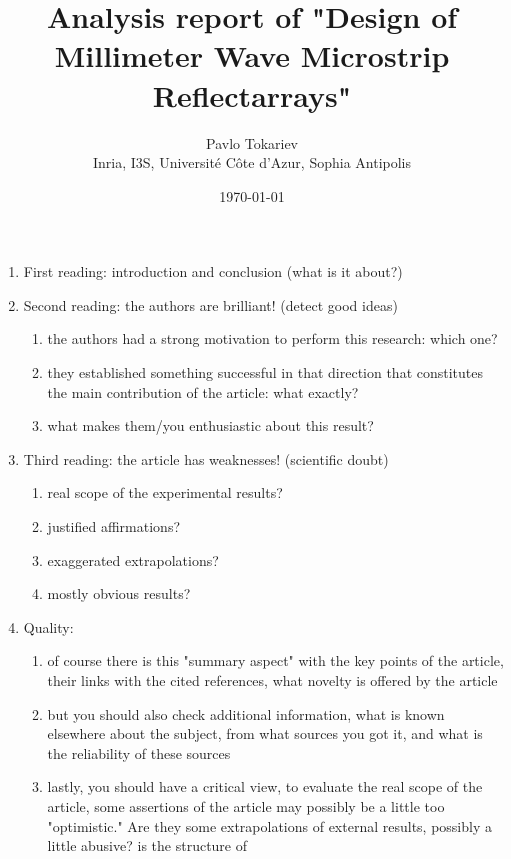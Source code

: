 \documentclass{article}
\title{Analysis report of "Design of Millimeter Wave Microstrip Reflectarrays"}
\author{Pavlo Tokariev\\Inria, I3S, Université Côte d'Azur, Sophia Antipolis}
\date{\today}
\begin{document}
    \maketitle

    \begin{enumerate}
        \item First reading: introduction and conclusion (what is it about?)
        \item Second reading: the authors are brilliant! (detect good ideas)
        \begin{enumerate}
            \item the authors had a strong motivation to perform this research: which one?
            \item they established something successful in that direction that constitutes the main contribution of the article: what exactly?
            \item what makes them/you enthusiastic about this result?
        \end{enumerate}
        \item Third reading: the article has weaknesses! (scientific doubt)
        \begin{enumerate}
            \item real scope of the experimental results?
            \item justified affirmations?
            \item exaggerated extrapolations?
            \item mostly obvious results?
        \end{enumerate}
        \item Quality:
        \begin{enumerate}
            \item of course there is this "summary aspect" with the key points of
            the article, their links with the cited references, what novelty is
            offered by the article
            \item but you should also check additional information, what is
            known elsewhere about the subject, from what sources you got
            it, and what is the reliability of these sources
            \item lastly, you should have a critical view, to evaluate the real
            scope of the article, some assertions of the article may possibly
            be a little too "optimistic." Are they some extrapolations of
            external results, possibly a little abusive? is the structure of

\end{enumerate}
\end{enumerate}
\end{document}
